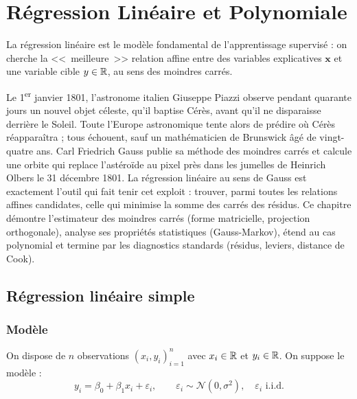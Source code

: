 \chapter{R\'egression Lin\'eaire et Polynomiale}
\label{ch:regression}

\begin{intuition}[title=\textbf{Id\'ee centrale}]
La r\'egression lin\'eaire est le mod\`ele fondamental de l'apprentissage supervis\'e : on cherche
la <<~meilleure~>> relation affine entre des variables explicatives $\bm{x}$ et une variable
cible $y \in \mathbb{R}$, au sens des moindres carr\'es.
\end{intuition}

Le 1\textsuperscript{er} janvier 1801, l'astronome italien Giuseppe Piazzi observe pendant quarante jours un nouvel objet céleste, qu'il baptise Cérès, avant qu'il ne disparaisse derrière le Soleil. Toute l'Europe astronomique tente alors de prédire où Cérès réapparaîtra ; tous échouent, sauf un mathématicien de Brunswick âgé de vingt-quatre ans. Carl Friedrich Gauss publie sa méthode des moindres carrés et calcule une orbite qui replace l'astéroïde au pixel près dans les jumelles de Heinrich Olbers le 31 décembre 1801. La régression linéaire au sens de Gauss est exactement l'outil qui fait tenir cet exploit : trouver, parmi toutes les relations affines candidates, celle qui minimise la somme des carrés des résidus. Ce chapitre démontre l'estimateur des moindres carrés (forme matricielle, projection orthogonale), analyse ses propriétés statistiques (Gauss-Markov), étend au cas polynomial et termine par les diagnostics standards (résidus, leviers, distance de Cook).

\section{R\'egression lin\'eaire simple}
\label{sec:reg-simple}

\subsection{Mod\`ele}

On dispose de $n$ observations $(x_i, y_i)_{i=1}^{n}$ avec $x_i \in \mathbb{R}$ et $y_i \in \mathbb{R}$.
On suppose le mod\`ele :
\[
  y_i = \beta_0 + \beta_1 x_i + \varepsilon_i, \qquad \varepsilon_i \sim \mathcal{N}(0, \sigma^2),
  \quad \varepsilon_i \text{ i.i.d.}
\]

